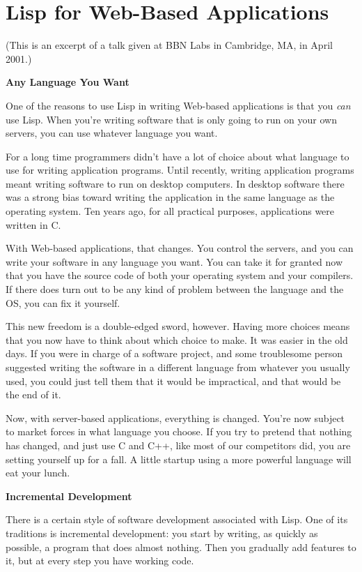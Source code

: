 \chapter{Lisp for Web-Based Applications}

(This is an excerpt of a talk given at BBN Labs in Cambridge, MA, in
April 2001.)

\textbf{Any Language You Want}

One of the reasons to use Lisp in writing Web-based applications is that
you \emph{can} use Lisp. When you're writing software that is only going
to run on your own servers, you can use whatever language you want.

For a long time programmers didn't have a lot of choice about what
language to use for writing application programs. Until recently,
writing application programs meant writing software to run on desktop
computers. In desktop software there was a strong bias toward writing
the application in the same language as the operating system. Ten years
ago, for all practical purposes, applications were written in C.

With Web-based applications, that changes. You control the servers, and
you can write your software in any language you want. You can take it
for granted now that you have the source code of both your operating
system and your compilers. If there does turn out to be any kind of
problem between the language and the OS, you can fix it yourself.

This new freedom is a double-edged sword, however. Having more choices
means that you now have to think about which choice to make. It was
easier in the old days. If you were in charge of a software project, and
some troublesome person suggested writing the software in a different
language from whatever you usually used, you could just tell them that
it would be impractical, and that would be the end of it.

Now, with server-based applications, everything is changed. You're now
subject to market forces in what language you choose. If you try to
pretend that nothing has changed, and just use C and C++, like most of
our competitors did, you are setting yourself up for a fall. A little
startup using a more powerful language will eat your lunch.

\textbf{Incremental Development}

There is a certain style of software development associated with Lisp.
One of its traditions is incremental development: you start by writing,
as quickly as possible, a program that does almost nothing. Then you
gradually add features to it, but at every step you have working code.


